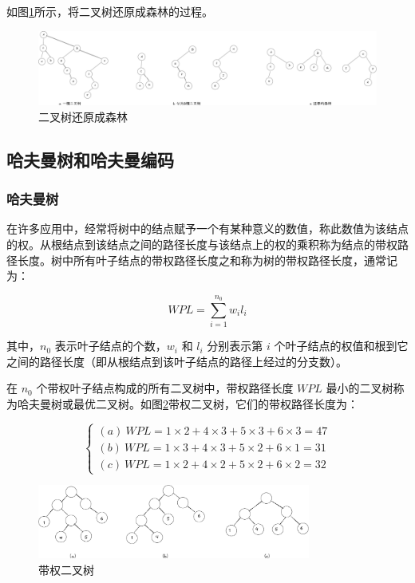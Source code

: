 \documentclass[lang=cn,newtx,10pt,scheme=chinese]{elegantbook}
\begin{document}
如图\ref{fig:BiTree2Forest}所示，将二叉树还原成森林的过程。

\begin{figure}[h!]
  \centering
  \includegraphics[width=1\textwidth]{./figure/pdf/cropped/Btree2Forest.pdf}
  \caption{二叉树还原成森林}
  \label{fig:BiTree2Forest}

\end{figure}
\subsection{哈夫曼树和哈夫曼编码}

\subsubsection{哈夫曼树}

在许多应用中，经常将树中的结点赋予一个有某种意义的数值，称此数值为该结点的权。从根结点到该结点之间的路径长度与该结点上的权的乘积称为结点的带权路径长度。树中所有叶子结点的带权路径长度之和称为树的带权路径长度，通常记为：

\[
WPL = \sum_{i=1}^{n_0} w_i l_i
\]

其中，$n_0$ 表示叶子结点的个数，$w_i$ 和 $l_i$ 分别表示第 $i$ 个叶子结点的权值和根到它之间的路径长度（即从根结点到该叶子结点的路径上经过的分支数）。

在 $n_0$ 个带权叶子结点构成的所有二叉树中，带权路径长度 $WPL$ 最小的二叉树称为哈夫曼树或最优二叉树。如图\ref{fig:weightBTree}带权二叉树，它们的带权路径长度为：

\[
\begin{cases}
(a) \ WPL = 1 \times 2 + 4 \times 3 + 5 \times 3 + 6 \times 3 = 47 \\
(b) \ WPL = 1 \times 3 + 4 \times 3 + 5 \times 2 + 6 \times 1 = 31 \\
(c) \ WPL = 1 \times 2 + 4 \times 2 + 5 \times 2 + 6 \times 2 = 32
\end{cases}
\]

\begin{figure}[h!]
  
  \centering

  \includegraphics[width=0.8\textwidth]{./figure/pdf/cropped/treeWeight.pdf}
  \caption{带权二叉树}
  \label{fig:weightBTree}
\end{figure}
\end{document}
